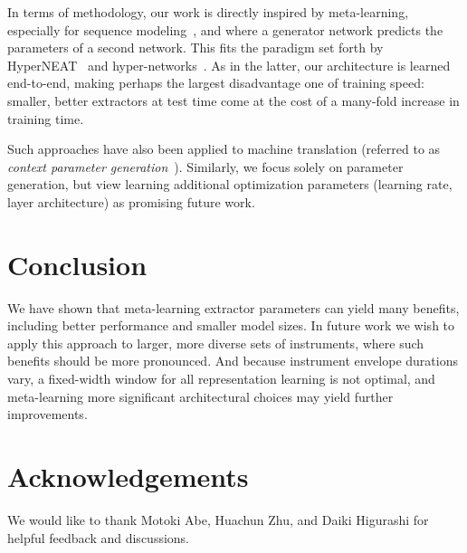 \documentclass{article}
\begin{document}
In terms of methodology, our work is directly inspired by meta-learning, especially for sequence modeling~\cite{meta-learning-LM}, and where a generator network predicts the parameters of a second network.  This fits the paradigm set forth by HyperNEAT~\cite{hyperNEAT} and hyper-networks~\cite{hyper-networks}.  As in the latter, our architecture is learned end-to-end, making perhaps the largest disadvantage one of training speed: smaller, better extractors at test time come at the cost of a many-fold increase in training time.

Such approaches have also been applied to machine translation (referred to as \emph{context parameter generation}~\cite{platanios-etal-2018-contextual}).  Similarly,
we focus solely on parameter generation, but view learning additional optimization parameters (learning rate, layer architecture) as promising future work.  
 \section{Conclusion}

We have shown that meta-learning extractor parameters can yield many benefits, including better performance and smaller model sizes.  In future work we wish to apply this approach to larger, more diverse sets of instruments, where such benefits should be more pronounced. And because instrument envelope durations vary, a fixed-width window for all representation learning is not optimal, and meta-learning more significant architectural choices may yield further improvements. 

\section{Acknowledgements}

We would like to thank Motoki Abe, Huachun Zhu, and Daiki Higurashi for helpful feedback and discussions.

\clearpage 


\end{document}
